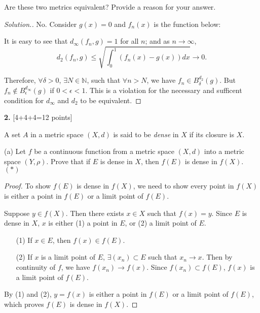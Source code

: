 \documentclass[11pt,a4paper]{amsart}
\def\N{{\mathbb N}}
\def\d{\delta}
\def\e{\epsilon}
\begin{document}
Are these two metrics equivalent? Provide a reason for your answer.

\begin{proof}[Solution.]
  No. Consider $g(x)=0$ and $f_n(x)$ is the function below:

  \begin{figure}[H]
    \label{fig_1}
  \end{figure}

  It is easy to see that $d_{\infty}(f_n, g) = 1$ for all $n$; and as $n\to\infty$,
  $$ d_2(f_n,g)  \le \sqrt{ \int_0^1 (f_n(x)-g(x)) dx } \to 0. $$

  Therefore, $\forall \d >0$, $\exists N \in\N$, such that $\forall n>N$, we have
  $f_n \in B_{\d}^{d_2}(g)$. But $f_n \not\in B_{\e}^{d_{\infty}}(g)$ if
  $0 < \e < 1$. This is a violation for the necessary and sufficent condition
  for $d_\infty$ and $d_2$ to be equivalent.
\end{proof}

\bigskip


{\bf 2.} [4+4+4=12 points]

A set $A$ in a metric space $(X,d)$ is said to be {\it dense} in $X$ if its closure is $X$.

(a) Let $f$ be a continuous function from a metric space $(X,d)$ into a metric space
$(Y,\rho)$. Prove that if $E$ is dense in $X$, then $f(E)$ is dense in $f(X)$. \hfil $(*)$

\begin{proof}
  To show $f(E)$ is dense in $f(X)$,  we need to show every point in $f(X)$ is
  either a point in $f(E)$ or a limit point of $f(E)$.

  Suppose $y \in f(X)$. Then there exists $x \in X$ such that $f(x) = y$.
  Since $E$ is dense in $X$, $x$ is either (1) a point in $E$,  or
  (2) a limit point of $E$.

  \begin{enumerate}
    \item[(1)] If $x \in E$, then $f(x) \in f(E)$.
    \item[(2)] If $x$ is a limit point of $E$,
                $\exists (x_n)\subset E$ such that $x_n \to x$.
                Then by continuity of $f$, we have $f(x_n) \to f(x)$.
                Since $f(x_n)\subset f(E)$, $f(x)$ is a limit point of $f(E)$.
  \end{enumerate}

  By (1) and (2), $y=f(x)$ is either a point in $f(E)$ or a limit point of $f(E)$,
  which proves $f(E)$ is dense in $f(X)$.
\end{proof}
\medskip
\end{document}
